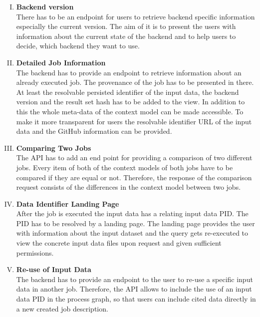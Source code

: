 \documentclass[draft,final]{vutinfth} %
\begin{document}
\begin{enumerate}[I.]
\item \textbf{Backend version} \\
	There has to be an endpoint for users to retrieve backend specific information especially the current version. The aim of it is to present the users with information about the current state of the backend and to help users to decide, which backend they want to use. 

\item \textbf{Detailed Job Information} \\
	The backend has to provide an endpoint to retrieve information about an already executed job. The provenance of the job has to be presented in there. At least the resolvable persisted identifier of the input data, the backend version and the result set hash has to be added to the view. In addition to this the whole meta-data of the context model can be made accessible. To make it more transparent for users the resolvable identifier URL of the input data and the GitHub information can be provided.   

\item \textbf{Comparing Two Jobs} \\
	The API has to add an end point for providing a comparison of two different jobs.  Every item of both of the context models of both jobs have to be compared if they are equal or not. Therefore, the response of the comparison request consists of the differences in the context model between two jobs.

\item \textbf{Data Identifier Landing Page} \\
	After the job is executed the input data has a relating input data PID. The PID has to be resolved by a landing page. The landing page provides the user with information about the input dataset and the query gets re-executed to view the concrete input data files upon request and given sufficient permissions.
    
\item \textbf{Re-use of Input Data} \\
	The backend has to provide an endpoint to the user to re-use a specific input data in another job. Therefore, the API allows to include the use of an input data PID in the process graph, so that users can include cited data directly in a new created job description.  
\end{enumerate}
\end{document}
